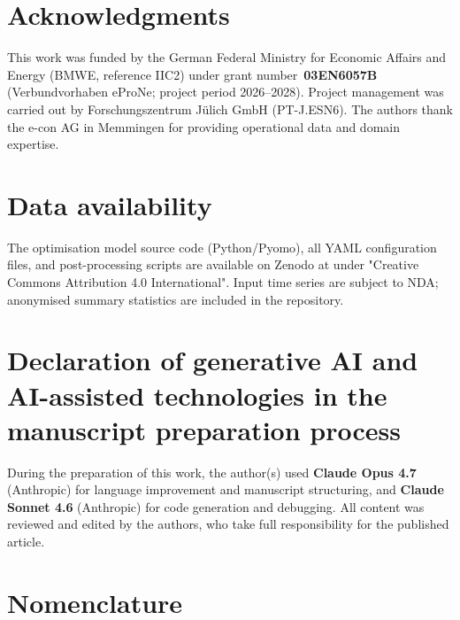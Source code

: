 \documentclass[a4paper,fleqn]{cas-dc}
\begin{document}
\section*{Acknowledgments}
This work was funded by the German Federal Ministry for Economic
Affairs and Energy (BMWE, reference IIC2) under grant
number~\textbf{03EN6057B} (Verbundvorhaben eProNe; project period 2026--2028).
Project management was carried out by Forschungszentrum J\"ulich
GmbH (PT-J.ESN6). The authors thank the e-con AG in
Memmingen for providing operational data and domain expertise.

\section*{Data availability}

The optimisation  model source code (Python/Pyomo), all YAML
configuration files, and post-processing scripts are available on
Zenodo at \citet{ruess_2026_calion} under
"Creative Commons Attribution 4.0 International". Input time series are subject to NDA; anonymised summary
statistics are included in the repository.

\section*{Declaration of generative AI and AI-assisted technologies in the manuscript preparation process}

During the preparation of this work, the author(s) used
\textbf{Claude Opus 4.7} (Anthropic) for language improvement and
manuscript structuring, and \textbf{Claude Sonnet 4.6} (Anthropic)
for code generation and debugging.  All content was reviewed and
edited by the authors, who take full responsibility for the
published article.


\appendix
\newpage

\section{Nomenclature}
\label{app:nomenclature}
\end{document}
